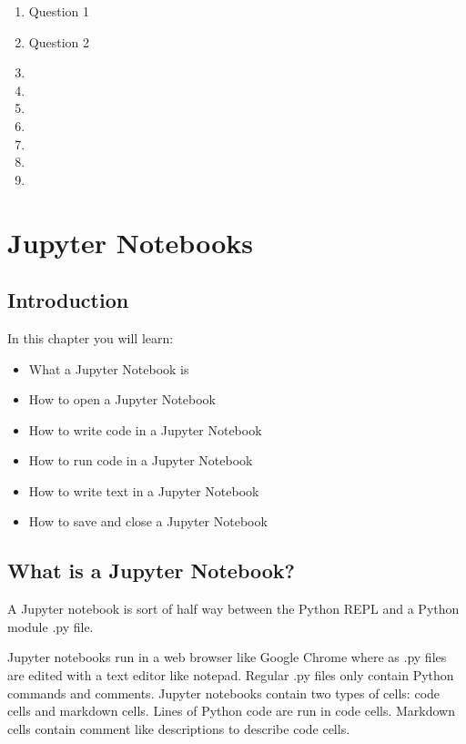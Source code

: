 \documentclass{book}
\begin{document}
    \begin{enumerate}
\def\labelenumi{\arabic{enumi}.}
\item
  Question 1
\item
  Question 2
\item
\item
\item
\item
\item
\item
\item
\end{enumerate}

    \chapter{Jupyter Notebooks}\label{jupyter-notebooks}

    \section{Introduction}\label{introduction}

    In this chapter you will learn:

\begin{itemize}
\item
  What a Jupyter Notebook is
\item
  How to open a Jupyter Notebook
\item
  How to write code in a Jupyter Notebook
\item
  How to run code in a Jupyter Notebook
\item
  How to write text in a Jupyter Notebook
\item
  How to save and close a Jupyter Notebook
\end{itemize}

    \section{What is a Jupyter Notebook?}\label{what-is-a-jupyter-notebook}

    A Jupyter notebook is sort of half way between the Python REPL and a
Python module .py file.

Jupyter notebooks run in a web browser like Google Chrome where as .py
files are edited with a text editor like notepad. Regular .py files only
contain Python commands and comments. Jupyter notebooks contain two
types of cells: code cells and markdown cells. Lines of Python code are
run in code cells. Markdown cells contain comment like descriptions to
describe code cells.
\end{document}
